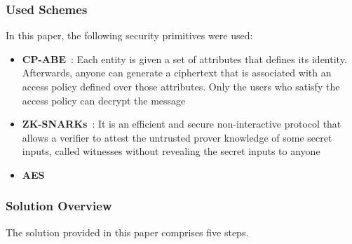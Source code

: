 \subsubsection{Used Schemes}
In this paper, the following security primitives were used:

\begin{itemize}
    \item \textbf{CP-ABE}~\cite{bethencourt2007ciphertext}: Each entity is given a set of attributes that defines its identity.
    Afterwards, anyone can generate a ciphertext that is associated with an access policy defined over those attributes.
    Only the users who satisfy the access policy can decrypt the message
    \item \textbf{ZK-SNARKs}~\cite{ben2013succinct}: It is an efficient and secure non-interactive protocol that allows a verifier to attest the untrusted prover knowledge of some secret inputs, called witnesses without revealing the secret inputs to anyone
    \item \textbf{AES}
\end{itemize}

\subsubsection{Solution Overview}
The solution provided in this paper comprises five steps.

